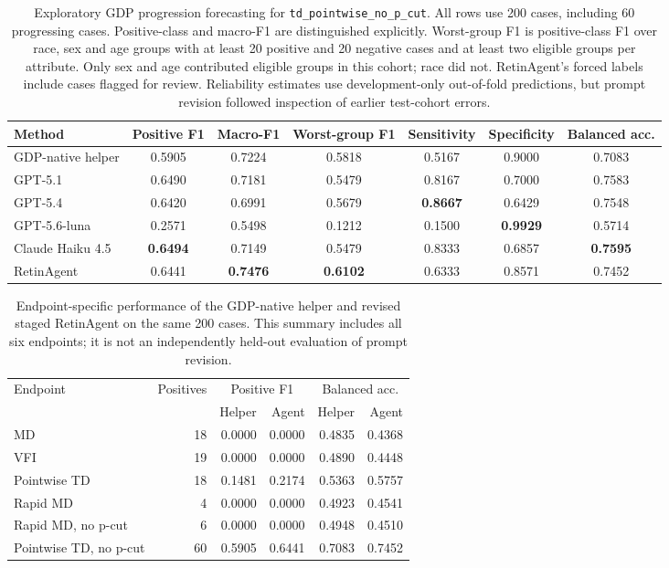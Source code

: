 \begin{table}[t]
\centering
\caption{Exploratory GDP progression forecasting for
\texttt{td\_pointwise\_no\_p\_cut}. All rows use 200 cases, including 60
progressing cases. Positive-class and macro-F1 are distinguished explicitly.
Worst-group F1 is positive-class F1 over race, sex and age groups with at least
20 positive and 20 negative cases and at least two eligible groups per
attribute. Only sex and age contributed eligible groups in this cohort;
race did not. RetinAgent's forced labels include cases flagged for review.
Reliability estimates use development-only out-of-fold predictions, but
prompt revision followed inspection of earlier test-cohort errors.}
\label{tab:gdp_progression_prediction}
\footnotesize
\begin{tabular}{@{}lcccccc@{}}
\toprule
Method & Positive F1 & Macro-F1 & Worst-group F1 & Sensitivity & Specificity & Balanced acc. \\
\midrule
GDP-native helper & 0.5905 & 0.7224 & 0.5818 & 0.5167 & 0.9000 & 0.7083 \\
GPT-5.1 & 0.6490 & 0.7181 & 0.5479 & 0.8167 & 0.7000 & 0.7583 \\
GPT-5.4 & 0.6420 & 0.6991 & 0.5679 & \textbf{0.8667} & 0.6429 & 0.7548 \\
GPT-5.6-luna & 0.2571 & 0.5498 & 0.1212 & 0.1500 & \textbf{0.9929} & 0.5714 \\
Claude Haiku 4.5 & \textbf{0.6494} & 0.7149 & 0.5479 & 0.8333 & 0.6857 & \textbf{0.7595} \\
RetinAgent & 0.6441 & \textbf{0.7476} & \textbf{0.6102} & 0.6333 & 0.8571 & 0.7452 \\
\bottomrule
\end{tabular}
\end{table}

\begin{table}[t]
\centering
\caption{Endpoint-specific performance of the GDP-native helper and revised
staged RetinAgent on the same 200 cases. This summary includes all six endpoints;
it is not an independently held-out evaluation of prompt revision.}
\label{tab:gdp_progression_endpoint_summary}
\footnotesize
\begin{tabular}{@{}lrrrrr@{}}
\toprule
Endpoint & Positives & \multicolumn{2}{c}{Positive F1} & \multicolumn{2}{c}{Balanced acc.} \\
 & & Helper & Agent & Helper & Agent \\
\midrule
MD & 18 & 0.0000 & 0.0000 & 0.4835 & 0.4368 \\
VFI & 19 & 0.0000 & 0.0000 & 0.4890 & 0.4448 \\
Pointwise TD & 18 & 0.1481 & 0.2174 & 0.5363 & 0.5757 \\
Rapid MD & 4 & 0.0000 & 0.0000 & 0.4923 & 0.4541 \\
Rapid MD, no p-cut & 6 & 0.0000 & 0.0000 & 0.4948 & 0.4510 \\
Pointwise TD, no p-cut & 60 & 0.5905 & 0.6441 & 0.7083 & 0.7452 \\
\bottomrule
\end{tabular}
\end{table}

